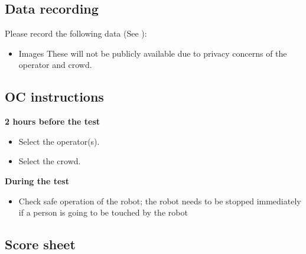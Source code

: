 \subsection{Data recording}
  Please record the following data (See ):
  \begin{itemize}
   \item Images These will not be publicly available due to privacy concerns of the operator and crowd. 
  \end{itemize}


%

\subsection{OC instructions}

\textbf{2 hours before the test}
\begin{itemize}
\item Select the  operator(s).
\item Select the crowd.
\end{itemize}

\textbf{During the test}
\begin{itemize}
\item Check safe operation of the robot; the robot needs to be stopped immediately if a person is going to be touched by the robot
\end{itemize}

\newpage
\subsection{Score sheet}


